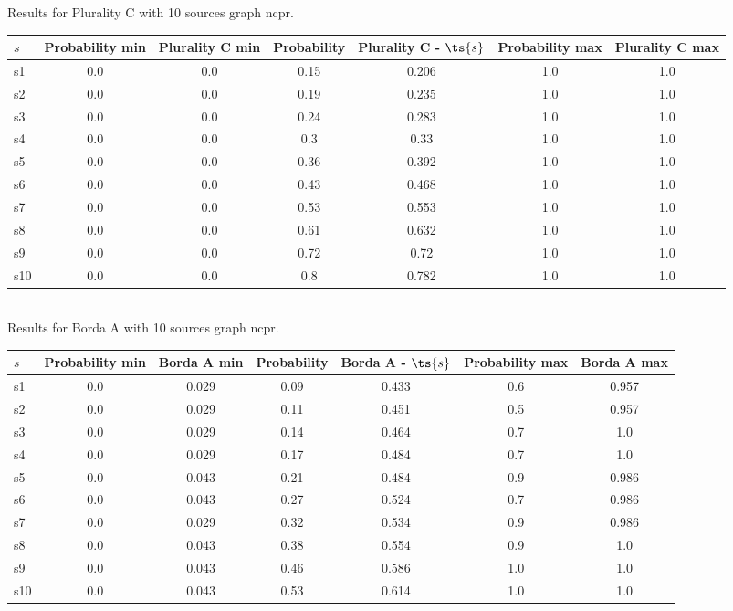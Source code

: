\documentclass{article}
\begin{document}
\noindent Results for Plurality C with 10 sources graph ncpr.

\noindent\begin{tabular}{|l|c|c|c|c|c|c|}
\hline
$s$& Probability min & Plurality C min & Probability & Plurality C - $\ts{s}$ & Probability max & Plurality C max\\
\hline
s1 &0.0 & 0.0 & 0.15 & 0.206 & 1.0 & 1.0\\
\hline
s2 &0.0 & 0.0 & 0.19 & 0.235 & 1.0 & 1.0\\
\hline
s3 &0.0 & 0.0 & 0.24 & 0.283 & 1.0 & 1.0\\
\hline
s4 &0.0 & 0.0 & 0.3 & 0.33 & 1.0 & 1.0\\
\hline
s5 &0.0 & 0.0 & 0.36 & 0.392 & 1.0 & 1.0\\
\hline
s6 &0.0 & 0.0 & 0.43 & 0.468 & 1.0 & 1.0\\
\hline
s7 &0.0 & 0.0 & 0.53 & 0.553 & 1.0 & 1.0\\
\hline
s8 &0.0 & 0.0 & 0.61 & 0.632 & 1.0 & 1.0\\
\hline
s9 &0.0 & 0.0 & 0.72 & 0.72 & 1.0 & 1.0\\
\hline
s10 &0.0 & 0.0 & 0.8 & 0.782 & 1.0 & 1.0\\
\hline
\end{tabular}\\

\noindent Results for Borda A with 10 sources graph ncpr.

\noindent\begin{tabular}{|l|c|c|c|c|c|c|}
\hline
$s$& Probability min & Borda A min & Probability & Borda A - $\ts{s}$ & Probability max & Borda A max\\
\hline
s1 &0.0 & 0.029 & 0.09 & 0.433 & 0.6 & 0.957\\
\hline
s2 &0.0 & 0.029 & 0.11 & 0.451 & 0.5 & 0.957\\
\hline
s3 &0.0 & 0.029 & 0.14 & 0.464 & 0.7 & 1.0\\
\hline
s4 &0.0 & 0.029 & 0.17 & 0.484 & 0.7 & 1.0\\
\hline
s5 &0.0 & 0.043 & 0.21 & 0.484 & 0.9 & 0.986\\
\hline
s6 &0.0 & 0.043 & 0.27 & 0.524 & 0.7 & 0.986\\
\hline
s7 &0.0 & 0.029 & 0.32 & 0.534 & 0.9 & 0.986\\
\hline
s8 &0.0 & 0.043 & 0.38 & 0.554 & 0.9 & 1.0\\
\hline
s9 &0.0 & 0.043 & 0.46 & 0.586 & 1.0 & 1.0\\
\hline
s10 &0.0 & 0.043 & 0.53 & 0.614 & 1.0 & 1.0\\
\hline
\end{tabular}\\
\end{document}
